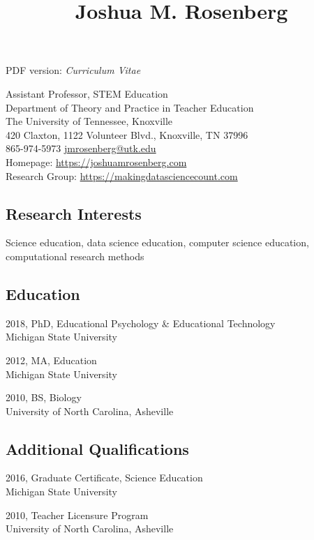 \documentclass[14,]{article}
\title{Joshua M. Rosenberg}
\date{}
\begin{document}
\maketitle

PDF version: \emph{Curriculum Vitae}

Assistant Professor, STEM Education\\
Department of Theory and Practice in Teacher Education\\
The University of Tennessee, Knoxville\\
420 Claxton, 1122 Volunteer Blvd., Knoxville, TN 37996\\
865-974-5973 \textbar{} \url{jmrosenberg@utk.edu}\\
Homepage: \url{https://joshuamrosenberg.com}\\
Research Group: \url{https://makingdatasciencecount.com}

\hypertarget{research-interests}{%
\subsection{Research Interests}\label{research-interests}}

Science education, data science education, computer science education,
computational research methods

\hypertarget{education}{%
\subsection{Education}\label{education}}

2018, PhD, Educational Psychology \& Educational Technology\\
Michigan State University

2012, MA, Education\\
Michigan State University

2010, BS, Biology\\
University of North Carolina, Asheville

\hypertarget{additional-qualifications}{%
\subsection{Additional Qualifications}\label{additional-qualifications}}

2016, Graduate Certificate, Science Education\\
Michigan State University

2010, Teacher Licensure Program\\
University of North Carolina, Asheville
\end{document}
